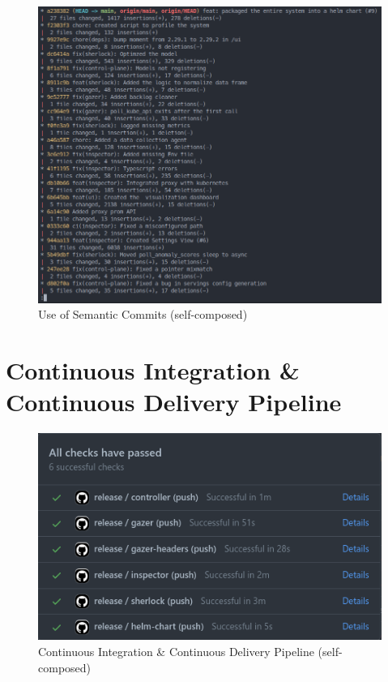 \begin{figure}[H]
    \includegraphics[width=16.5cm]{assets/appendix/commits.png}
    \caption{Use of Semantic Commits (self-composed)}
\end{figure}


\section{Continuous Integration \& Continuous Delivery Pipeline}

\begin{figure}[H]
    \includegraphics[width=16.5cm]{assets/appendix/ci.png}
    \caption{Continuous Integration \& Continuous Delivery Pipeline (self-composed)}
\end{figure}